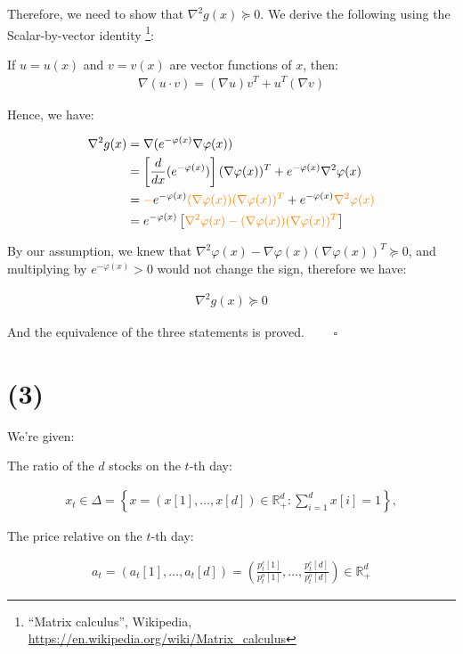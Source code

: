 \documentclass{article}
\begin{document}
Therefore, we need to show that $\nabla^2 g(x) \succeq 0$.
We derive the following using the Scalar-by-vector identity
\footnote{``Matrix calculus'', Wikipedia, \url{https://en.wikipedia.org/wiki/Matrix_calculus}}:
\bigskip

If $u = u(x)$ and $v = v(x)$ are vector functions of $x$, then:
\begin{align*}
    \nabla (u \cdot v) = (\nabla u) v^T + u^T (\nabla v)
\end{align*}

Hence, we have:

\begin{align*}
    \nabla^2 g(x) 
    &= \nabla(e^{-\varphi(x)} \nabla \varphi(x)) \\
    &= \left[ \frac{d}{dx}(e^{-\varphi(x)}) \right] (\nabla \varphi(x))^T + e^{-\varphi(x)} \nabla^2 \varphi(x) \\
    &= \textcolor{orange}{-} e^{-\varphi(x)} \textcolor{orange}{(\nabla \varphi(x))(\nabla \varphi(x))^T} + e^{-\varphi(x)} \textcolor{orange}{\nabla^2 \varphi(x)} \\
    &= e^{-\varphi(x)} \left[ \textcolor{orange}{\nabla^2 \varphi(x) - (\nabla \varphi(x))(\nabla \varphi(x))^T} \right]
\end{align*}

By our assumption, we knew that $\nabla^2 \varphi(x) - \nabla \varphi(x) (\nabla \varphi(x))^T \succeq 0$,
and multiplying by $e^{-\varphi(x)} > 0$ would not change the sign, therefore we have:

\begin{align*}
    \nabla^2 g(x) \succeq 0
\end{align*}

And the equivalence of the three statements is proved. $\qquad \square$

\section*{(3)}

We're given:

The ratio of the $d$ stocks on the $t$-th day:

\begin{align*}
    x_t \in \Delta = \left\{ x = ( x[1], \ldots, x[d] ) \in \mathbb{R}_+^d : \sum_{i = 1}^d x [i] = 1 \right\} ,
\end{align*}

The price relative on the $t$-th day:

\begin{align*}
    a_t = ( a_t[1], \ldots, a_t[d] ) = \left( \frac{p^c_t[1]}{p^o_t[1]}, \ldots, \frac{p^c_t[d]}{p^o_t[d]} \right) \in \mathbb{R}_+^d 
\end{align*}
\end{document}
